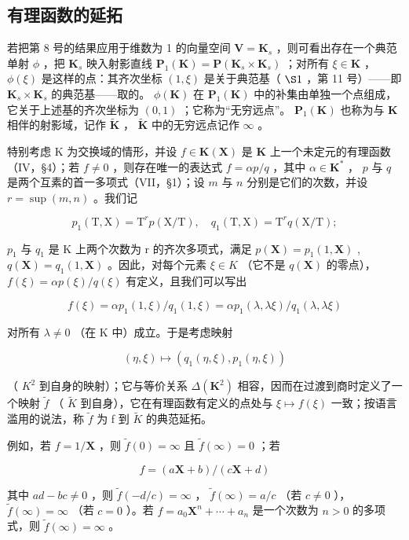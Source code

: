 \subsection{有理函数的延拓}

若把第 8 号的结果应用于维数为 1 的向量空间 \(\mathbf{V} = \mathbf{K}_s\) ，则可看出存在一个典范单射 \(\phi\) ，把 \(\mathbf{K}_s\) 映入射影直线 \(\mathbf{P}_1(\mathbf{K}) = \mathbf{P}(\mathbf{K}_s \times \mathbf{K}_s)\) ；对所有 \(\xi \in \mathbf{K}\) ， \(\phi(\xi)\) 是这样的点：其齐次坐标 \((1, \xi)\) 是关于典范基（ \(\S 1\) ，第 11 号）——即 \(\mathbf{K}_s \times \mathbf{K}_s\) 的典范基——取的。 \(\phi(\mathbf{K})\) 在 \(\mathbf{P}_1(\mathbf{K})\) 中的补集由单独一个点组成，它关于上述基的齐次坐标为 \((0, 1)\) ；它称为“无穷远点”。 \(\mathbf{P}_1(\mathbf{K})\) 也称为与 \(\mathbf{K}\) 相伴的射影域，记作 \(\tilde{\mathbf{K}}\) ， \(\tilde{\mathbf{K}}\) 中的无穷远点记作 \(\infty\) 。

特别考虑 K 为交换域的情形，并设 \(f \in \mathbf{K}(\mathbf{X})\) 是 \(\mathbf{K}\) 上一个未定元的有理函数（IV，§4）；若 \(f \neq 0\) ，则存在唯一的表达式 \(f = \alpha p/q\) ，其中 \(\alpha \in \mathbf{K}^*\) ， \(p\) 与 \(q\) 是两个互素的首一多项式（VII，§1）；设 \(m\) 与 \(n\) 分别是它们的次数，并设 \(r = \sup(m, n)\) 。我们记

\[
p _ {1} (\mathrm{T}, \mathrm{X}) = \mathrm{T} ^ {r} p (\mathrm{X} / \mathrm{T}), \quad q _ {1} (\mathrm{T}, \mathrm{X}) = \mathrm{T} ^ {r} q (\mathrm{X} / \mathrm{T});
\]

\(p_{1}\) 与 \(q_{1}\) 是 K 上两个次数为 r 的齐次多项式，满足 \(p(\mathbf{X}) = p_{1}(1, \mathbf{X})\) , \(q(\mathbf{X}) = q_{1}(1, \mathbf{X})\) 。因此，对每个元素 \(\xi \in K\) （它不是 \(q(\mathbf{X})\) 的零点）， \(f(\xi) = \alpha p(\xi)/q(\xi)\) 有定义，且我们可以写出

\[
f (\xi) = \alpha p _ {1} (1, \xi) / q _ {1} (1, \xi) = \alpha p _ {1} (\lambda , \lambda \xi) / q _ {1} (\lambda , \lambda \xi)
\]

对所有 \(\lambda \neq 0\) （在 K 中）成立。于是考虑映射

\[
(\eta , \xi) \mapsto (q _ {1} (\eta , \xi), p _ {1} (\eta , \xi))
\]

（ \(K^{2}\) 到自身的映射）；它与等价关系 \(\Delta(\mathbf{K}^{2})\) 相容，因而在过渡到商时定义了一个映射 \(\tilde{f}\) （ \(\tilde{K}\) 到自身），它在有理函数有定义的点处与 \(\xi\mapsto f(\xi)\) 一致；按语言滥用的说法，称 \(\tilde{f}\) 为 f 到 \(\tilde{K}\) 的典范延拓。

例如，若 \(f = 1 / \mathbf{X}\) ，则 \(\tilde{f}(0) = \infty\) 且 \(\tilde{f}(\infty) = 0\) ；若

\[
f = (a \mathbf {X} + b) / (c \mathbf {X} + d)
\]

其中 \(ad - bc \neq 0\) ，则 \(\tilde{f}(-d/c) = \infty\) ， \(\tilde{f}(\infty) = a/c\) （若 \(c \neq 0\) ）， \(\tilde{f}(\infty) = \infty\) （若 \(c = 0\) ）。若 \(f = a_0\mathbf{X}^n + \cdots + a_n\) 是一个次数为 \(n > 0\) 的多项式，则 \(\tilde{f}(\infty) = \infty\) 。

